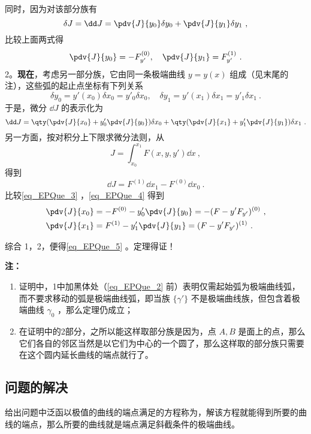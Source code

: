同时，因为对该部分族有
\begin{equation}
\delta J=\dd J=\pdv{J}{y_0}\delta y_0+\pdv{J}{y_1}\delta y_1~,
\end{equation}
比较上面两式得
\begin{equation}
\pdv{J}{y_0}=-F_{y'}^{(0)},\quad \pdv{J}{y_1}=F_{y'}^{(1)}~.
\end{equation}
2。\textbf{现在}，考虑另一部分族，它由同一条极端曲线 $y=y(x)$ 组成（见末尾的注），这些弧的起止点坐标有下列关系
\begin{equation}
\delta y_0=y'(x_0)\delta x_0=y'_0\delta x_0,\quad \delta y_1=y'(x_1)\delta x_1=y'_1\delta x_1~.
\end{equation}
于是，微分 $\dd J$ 的表示化为
\begin{equation}\label{eq_EPQue_3}
\dd J=\qty(\pdv{J}{x_0}+y'_0\pdv{J}{y_0})\delta x_0+\qty(\pdv{J}{x_1}+y'_1\pdv{J}{y_1})\delta x_1~.
\end{equation}
另一方面，按对积分上下限求微分法则，从
\begin{equation}
J=\int_{x_0}^{x_1}F(x,y,y')\dd x~,
\end{equation}
得到
\begin{equation}\label{eq_EPQue_4}
\dd J=F^{(1)}\dd x_1-F^{(0)}\dd x_0~.
\end{equation}
比较\autoref{eq_EPQue_3} ，\autoref{eq_EPQue_4} 得到
\begin{equation}
\begin{aligned}
&\pdv{J}{x_0}=-F^{(0)}-y'_0\pdv{J}{y_0}=-(F-y'F_{y'})^{(0)}~,\\
&\pdv{J}{x_1}=F^{(1)}-y'_1\pdv{J}{y_1}=(F-y'F_{y'})^{(1)}~.
\end{aligned}
\end{equation}

综合 1，2，便得\autoref{eq_EPQue_5} 。定理得证！

\textbf{注：}
\begin{enumerate}
\item 证明中，1中加黑体处（\autoref{eq_EPQue_2} 前）表明仅需起始弧为极端曲线弧，而不要求移动的弧是极端曲线弧，即当族 $\{\gamma'\}$ 不是极端曲线族，但包含着极端曲线 $\gamma_0$ ，那么定理仍成立；
\item 在证明中的2部分，之所以能这样取部分族是因为，点 $A,B$ 是面上的点，那么它们各自的邻区当然是以它们为中心的一个圆了，那么这样取的部分族只需要在这个圆内延长曲线的端点就行了。
\end{enumerate}
\subsection{问题的解决}
给出问题中泛函以极值的曲线的端点满足的方程称为，解该方程就能得到所要的曲线的端点，那么所要的曲线就是端点满足斜截条件的极端曲线。

